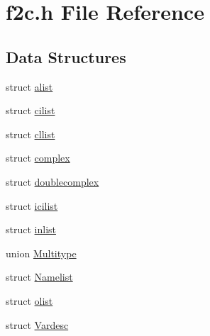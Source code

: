 \hypertarget{dependencies_2third-party_2clapack_23_82_81_2_f2_c_l_i_b_s_2libf2c_2f2c_8h}{}\section{f2c.\+h File Reference}
\label{dependencies_2third-party_2clapack_23_82_81_2_f2_c_l_i_b_s_2libf2c_2f2c_8h}
\subsection*{Data Structures}
\begin{DoxyCompactItemize}
\item 
struct \hyperlink{structalist}{alist}
\item 
struct \hyperlink{structcilist}{cilist}
\item 
struct \hyperlink{structcllist}{cllist}
\item 
struct \hyperlink{structcomplex}{complex}
\item 
struct \hyperlink{structdoublecomplex}{doublecomplex}
\item 
struct \hyperlink{structicilist}{icilist}
\item 
struct \hyperlink{structinlist}{inlist}
\item 
union \hyperlink{union_multitype}{Multitype}
\item 
struct \hyperlink{struct_namelist}{Namelist}
\item 
struct \hyperlink{structolist}{olist}
\item 
struct \hyperlink{struct_vardesc}{Vardesc}
\end{DoxyCompactItemize}
